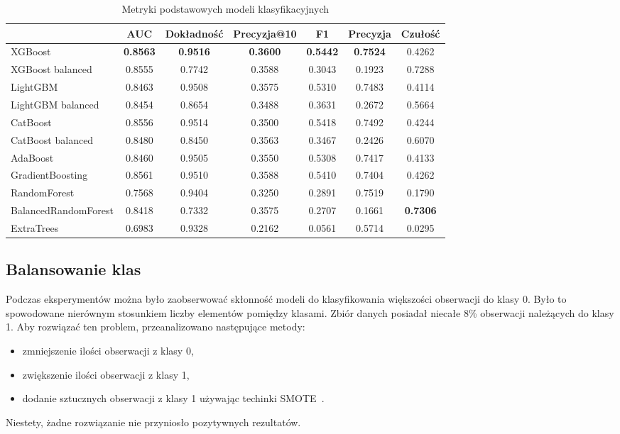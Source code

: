 \documentclass[a4paper,12pt]{article}
\begin{document}
    \begin{table}
        \hspace*{-1cm}
        \begin{tabular}{l|*{6}{c}}
            & AUC & Dokładność & Precyzja@10 & F1 & Precyzja & Czułość \\
            \hline
            XGBoost & \textbf{0.8563} & \textbf{0.9516} & \textbf{0.3600} & \textbf{0.5442} & \textbf{0.7524} & 0.4262 \\
            XGBoost balanced & 0.8555 & 0.7742 & 0.3588 & 0.3043 & 0.1923 & 0.7288 \\
            LightGBM & 0.8463 & 0.9508 & 0.3575 & 0.5310 & 0.7483 & 0.4114 \\
            LightGBM balanced & 0.8454 & 0.8654 & 0.3488 & 0.3631 & 0.2672 & 0.5664 \\
            CatBoost & 0.8556 & 0.9514 & 0.3500 & 0.5418 & 0.7492 & 0.4244 \\
            CatBoost balanced & 0.8480 & 0.8450 & 0.3563 & 0.3467 & 0.2426 & 0.6070 \\
            AdaBoost & 0.8460 & 0.9505 & 0.3550 & 0.5308 & 0.7417 & 0.4133 \\
            GradientBoosting & 0.8561 & 0.9510 & 0.3588 & 0.5410 & 0.7404 & 0.4262 \\
            RandomForest & 0.7568 & 0.9404 & 0.3250 & 0.2891 & 0.7519 & 0.1790 \\
            BalancedRandomForest & 0.8418 & 0.7332 & 0.3575 & 0.2707 & 0.1661 & \textbf{0.7306} \\
            ExtraTrees & 0.6983 & 0.9328 & 0.2162 & 0.0561 & 0.5714 & 0.0295 \\
        \end{tabular}
        \hspace*{1cm}
        \caption{Metryki podstawowych modeli klasyfikacyjnych}
        \label{tab:score-comparison}
    \end{table}

    \subsection{Balansowanie klas}

    Podczas eksperymentów można było zaobserwować skłonność modeli do klasyfikowania większości obserwacji do klasy 0.
    Było to spowodowane nierównym stosunkiem liczby elementów pomiędzy klasami.
    Zbiór danych posiadał niecałe 8\% obserwacji należących do klasy 1.
    Aby rozwiązać ten problem, przeanalizowano następujące metody:
    \begin{itemize}
        \item zmniejszenie ilości obserwacji z klasy 0,
        \item zwiększenie ilości obserwacji z klasy 1,
        \item dodanie sztucznych obserwacji z klasy 1 używając techinki SMOTE~\cite{smote}.
    \end{itemize}
    Niestety, żadne rozwiązanie nie przyniosło pozytywnych rezultatów.
\end{document}
